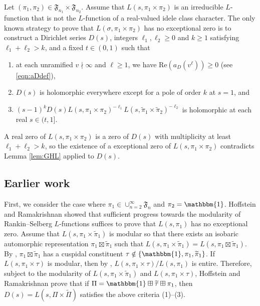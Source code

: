 \documentclass[11pt]{amsart}
\theoremstyle{remark}
\numberwithin{equation}{section}
\begin{document}
Let $(\pi_1,\pi_2)\in\mathfrak{F}_{n_1}\times\mathfrak{F}_{n_2}$.  Assume that $L(s,\pi_1\times\pi_2)$ is an irreducible $L$-function that is not the $L$-function of a real-valued idele class character.  The only known strategy to prove that $L(\sigma,\pi_1\times\pi_2)$ has no exceptional zero is to construct a Dirichlet series $D(s)$, integers $\ell_1,\ell_2\geq 0$ and $k\geq 1$ satisfying $\ell_1+\ell_2>k$, and a fixed $t\in(0,1)$ such that
\begin{enumerate}
	\item at each unramified $v\nmid\infty$ and $\ell\geq 1$, we have $\mathrm{Re}(a_D(v^{\ell}))\geq 0$ (see \eqref{eqn:aDdef}),
	\item $D(s)$ is holomorphic everywhere except for a pole of order $k$ at $s=1$, and
	\item $(s-1)^{k}D(s) L(s,\pi_1\times\pi_2)^{-\ell_1}L(s,\widetilde{\pi}_1\times\widetilde{\pi}_2)^{-\ell_2}$ is holomorphic at each real $s\in(t,1]$.
\end{enumerate}
A real zero of $L(s,\pi_1\times\pi_2)$ is a zero of $D(s)$ with multiplicity at least $\ell_1+\ell_2>k$, so the existence of a exceptional zero of $L(s,\pi_1\times\pi_2)$ contradicts Lemma \ref{lem:GHL} applied to $D(s)$.

\subsection{Earlier work}
\label{subsec:earlier_work}

First, we consider the case where $\pi_1\in\cup_{n=2}^{\infty}\mathfrak{F}_{n}$ and $\pi_2=\mathbbm{1}$.  Hoffstein and Ramakrishnan \cite[Proof of Theorem B]{HoffsteinRamakrishnan} showed that sufficient progress towards the modularity of Rankin--Selberg $L$-functions suffices to prove that $L(s,\pi_1)$ has no exceptional zero.  Assume that $L(s,\pi_1\times\widetilde{\pi}_1)$ is modular so that there exists an isobaric automorphic representation $\pi_1\boxtimes\widetilde{\pi}_1$ such that $L(s,\pi_1\times\widetilde{\pi}_1)=L(s,\pi_1\boxtimes\widetilde{\pi}_1)$.  By \cite[Lemma 4.4]{HoffsteinRamakrishnan}, $\pi_1\boxtimes\tilde{\pi}_1$ has a cuspidal constituent $\tau\notin\{\mathbbm{1},\pi_1,\widetilde{\pi}_1\}$.  If $L(s,\pi_1\times\tau)$ is modular, then by \cite[Proofs of Lemma 4.4 and Claim 4.5]{HoffsteinLockhart}, $L(s,\pi_1\times\tau)/L(s,\pi_1)$ is entire.  Therefore, subject to the modularity of $L(s,\pi_1\times\widetilde{\pi}_1)$ and $L(s,\pi_1\times\tau)$, Hoffstein and Ramakrishnan prove that if $\Pi=\mathbbm{1}\boxplus\widetilde{\tau}\boxplus\pi_1$, then $D(s)=L(s,\Pi\times\widetilde{\Pi})$ satisfies the above criteria (1)--(3).
\end{document}
